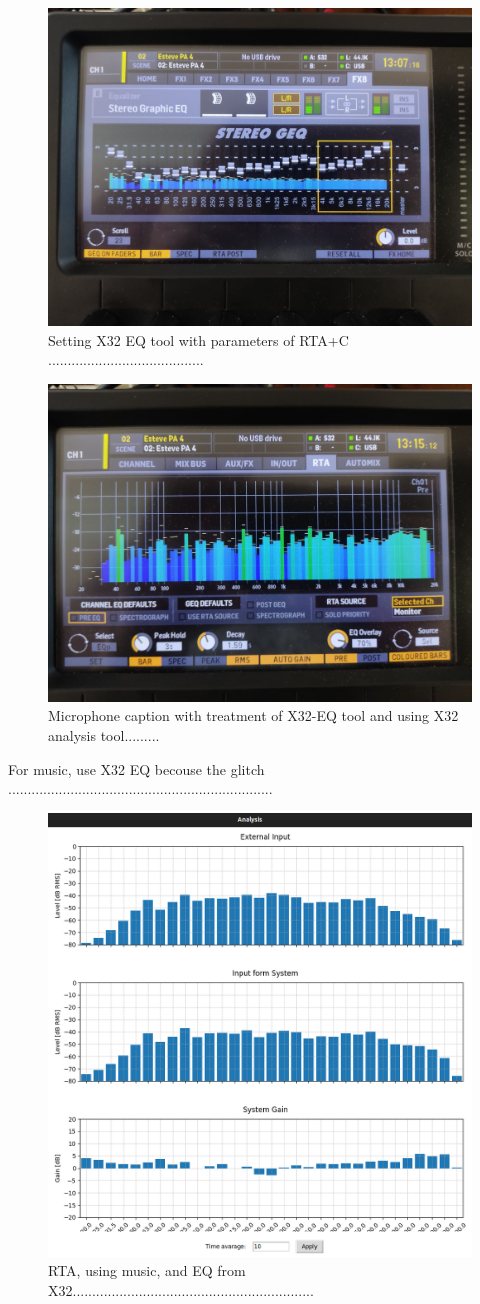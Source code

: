 \begin{figure}[H]
	\centering
	\includegraphics[width=0.6
	\linewidth]{Figures/Coro_X32_EQ.jpeg}
	\caption{Setting X32 EQ tool with parameters of RTA+C ........................................}
	\label{fig:Coro_X32_EQ}
\end{figure}

\begin{figure}[H]
	\centering
	\includegraphics[width=0.6
	\linewidth]{Figures/Coro_X32_treatedX32.jpeg}
	\caption{Microphone caption with treatment of X32-EQ tool and using X32 analysis tool.........}
	\label{fig:Coro_X32_treatedX32}
\end{figure}

For music, use X32 EQ becouse the glitch ....................................................................

\begin{figure}[H]
	\centering
	\includegraphics[width=0.6
	\linewidth]{Figures/Coro_Music_EQ_X32.png}
	\caption{RTA, using music, and EQ from X32..............................................................}
	\label{fig:Coro_RTA_music}
\end{figure}

